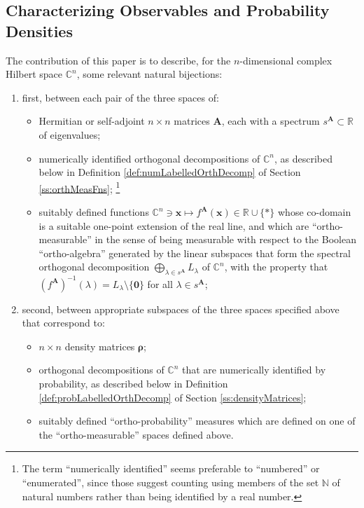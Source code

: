 \documentclass[11pt]{article}
\newcommand \R { \mathbb{R} }
\newcommand \N { \mathbb{N} }
\newcommand \C { \mathbb{C} }
\begin{document}
\subsection{Characterizing Observables and Probability Densities}

The contribution of this paper is to describe, 
for the $n$-dimensional complex Hilbert space $ \C^n $, some relevant natural bijections: 
\begin{enumerate}
	\item first, between each pair of the three spaces of:
	\begin{itemize}
		\item Hermitian or self-adjoint $n \times n$ matrices $ \mathbf A$,
		each with a spectrum $ s^{ \mathbf A} \subset \R$ of eigenvalues;
		\item numerically identified orthogonal decompositions of $ \C^n $, 
		as described below in Definition \ref{def:numLabelledOrthDecomp} 
		of Section \ref{ss:orthMeasFns};%
\footnote{The term ``numerically identified'' 
seems preferable to ``numbered'' or ``enumerated'',
since those suggest counting using members of the set $ \N $ of natural numbers 
rather than being identified by a real number.} 
		\item suitably defined functions 
		 \( \C^n \owns \mathbf x \mapsto f^\mathbf A( \mathbf x) \in \R \cup \{*\} \)
		whose co-domain is a suitable one-point extension of the real line,
		and which are ``ortho-measurable'' in the sense of being measurable 
		with respect to the Boolean ``ortho-algebra'' generated by the linear subspaces 
		that form the spectral orthogonal decomposition 
 \( \bigoplus _{ \lambda \in s^{ \mathbf A}} L_\lambda \)
		of $ \C^n $, with the property that 
 \( ( f^\mathbf A) ^{-1} ( \lambda ) = L_\lambda \setminus \{ \mathbf 0 \} \) 
 		for all $ \lambda \in s^{ \mathbf A} $;
	\end{itemize}
%
 	\item second, between appropriate subspaces of the three spaces specified above
	that correspond to:
	\begin{itemize}
		\item $n \times n$ density matrices $ \boldsymbol \rho $;
		\item orthogonal decompositions of $ \C^n $ 
		that are numerically identified by probability, 
		as described below in Definition \ref{def:probLabelledOrthDecomp}
		of Section \ref{ss:densityMatrices};
%
		\item suitably defined ``ortho-probability'' measures which are defined 
		on one of the ``ortho-measurable'' spaces defined above.
	\end{itemize}
\end{enumerate}
\end{document}
